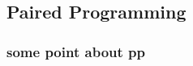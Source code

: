 \documentclass[class=book , crop=false]{standalone}
\begin{document}
\subsection{Paired Programming}

	\subsubsection{ some point about pp}
	
\end{document}
